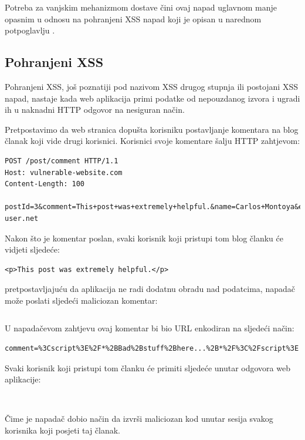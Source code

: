 \documentclass[12pt, oneside, onecolumn]{book}
\begin{document}
{Potreba za vanjskim mehanizmom dostave čini ovaj napad uglavnom manje opasnim u odnosu na pohranjeni XSS napad koji je opisan u narednom potpoglavlju \cite{xssref}.

\subsection{Pohranjeni XSS}
Pohranjeni XSS, još poznatiji pod nazivom XSS drugog stupnja ili postojani XSS napad, nastaje kada web aplikacija primi podatke od nepouzdanog izvora i ugradi ih u naknadni HTTP odgovor na nesiguran način. 

Pretpostavimo da web stranica dopušta korisniku postavljanje komentara na blog članak koji vide drugi korisnici. Korisnici svoje komentare šalju HTTP zahtjevom:

\begin{verbatim}
POST /post/comment HTTP/1.1
Host: vulnerable-website.com
Content-Length: 100

postId=3&comment=This+post+was+extremely+helpful.&name=Carlos+Montoya&email=carlos%40normal-user.net
\end{verbatim}

Nakon što je komentar poslan, svaki korisnik koji pristupi tom blog članku će vidjeti sljedeće:

\begin{verbatim}
<p>This post was extremely helpful.</p>
\end{verbatim}

pretpostavljajuću da aplikacija ne radi dodatnu obradu nad podatcima, napadač može poslati sljedeći maliciozan komentar:

\begin{verbatim}

\end{verbatim}

U napadačevom zahtjevu ovaj komentar bi bio URL enkodiran na sljedeći način:

\begin{verbatim}
comment=%3Cscript%3E%2F*%2BBad%2Bstuff%2Bhere...%2B*%2F%3C%2Fscript%3E
\end{verbatim}

Svaki korisnik koji pristupi tom članku će primiti sljedeće unutar odgovora web aplikacije:

\begin{verbatim}


\end{verbatim}

Čime je napadač dobio način da izvrši maliciozan kod unutar sesija svakog korisnika koji posjeti taj članak.

}
\end{document}

